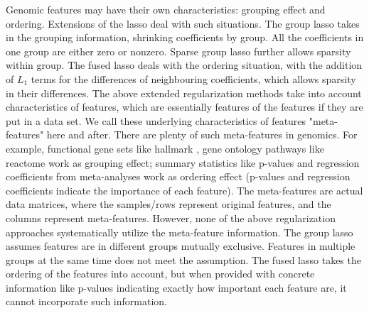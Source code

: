Genomic features may have their own characteristics: grouping effect and ordering. Extensions of the lasso deal with such situations. The group lasso \citep{yuan2006model} takes in the grouping information, shrinking coefficients by group. All the coefficients in one group are either zero or nonzero. Sparse group lasso \citep{simon2013sparse} further allows sparsity within group. The fused lasso deals with the ordering situation, with the addition of $L_1$ terms for the differences of neighbouring coefficients, which allows sparsity in their differences. The above extended regularization methods take into account characteristics of features, which are essentially features of the features if they are put in a data set. We call these underlying characteristics of features "meta-features" here and after. There are plenty of such meta-features in genomics. For example, functional gene sets like hallmark \citep{liberzon2015molecular}, gene ontology pathways like reactome \citep{jassal2020reactome} work as grouping effect; summary statistics like p-values and regression coefficients from meta-analyses work as ordering effect (p-values and regression coefficients indicate the importance of each feature). The meta-features are actual data matrices, where the samples/rows represent original features, and the columns represent meta-features. However, none of the above regularization approaches systematically utilize the meta-feature information. The group lasso assumes features are in different groups mutually exclusive. Features in multiple groups at the same time does not meet the assumption. The fused lasso takes the ordering of the features into account, but when provided with concrete information like p-values indicating exactly how important each feature are, it cannot incorporate such information. 

